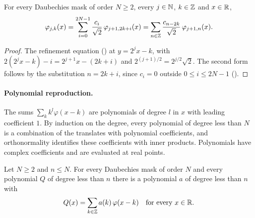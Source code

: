 \begin{proposition}
\label{prop:daub-scaled-refine}
\leanok
{}
For every Daubechies mask of order $N \geq 2$, every $j \in \mathbb{N}$, $k \in \mathbb{Z}$ and $x \in \mathbb{R}$,
\[
  \varphi_{j,k}(x) = \sum_{i=0}^{2N-1} \frac{c_i}{\sqrt 2} \, \varphi_{j+1, 2k+i}(x)
  = \sum_{n \in \mathbb{Z}} \frac{c_{n-2k}}{\sqrt 2} \, \varphi_{j+1,n}(x) .
\]
\end{proposition}

\begin{proof}
\leanok
{}
The refinement equation () at $y = 2^j x - k$, with
$2(2^j x - k) - i = 2^{j+1} x - (2k + i)$ and $2^{(j+1)/2} = 2^{j/2} \sqrt 2$. The second form
follows by the substitution $n = 2k + i$, since $c_i = 0$ outside $0 \leq i \leq 2N - 1$
().
\end{proof}

\paragraph{Polynomial reproduction.}
The sums $\sum_k k^l \varphi(x - k)$ are polynomials of degree $l$ in $x$ with leading
coefficient $1$. By induction on the degree, every polynomial of degree less than $N$ is a
combination of the translates with polynomial coefficients, and orthonormality identifies these
coefficients with inner products. Polynomials have complex coefficients and are evaluated at
real points.

\begin{proposition}
\label{prop:daub-poly-combination}
\leanok
{}
Let $N \geq 2$ and $n \leq N$. For every Daubechies mask of order $N$ and every polynomial $Q$
of degree less than $n$ there is a polynomial $a$ of degree less than $n$ with
\[
  Q(x) = \sum_{k \in \mathbb{Z}} a(k) \, \varphi(x - k) \quad\text{for every } x \in \mathbb{R} .
\]
\end{proposition}

